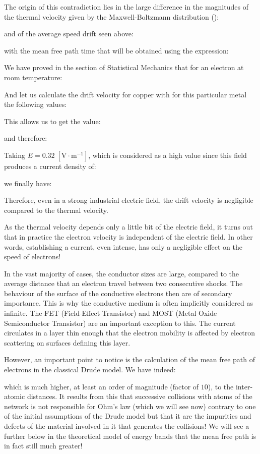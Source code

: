 	The origin of this contradiction lies in the large difference in the magnitudes of the thermal velocity given by the Maxwell-Boltzmann distribution ():
	
	and of the average speed drift seen above:
	
	with the mean free path time that will be obtained using the expression:
	
	
	We have proved in the section of Statistical Mechanics that for an electron at room temperature:
	
	And let us calculate the drift velocity for copper with for this particular metal the following values:
	
	This allows us to get the value:
	
	and therefore:
	
	Taking $E=0.32 \;[\text{V}\cdot\text{m}^{-1}]$, which is considered as a high value since this field produces a current density of:
	
	we finally have:
	
	Therefore, even in a strong industrial electric field, the drift velocity is negligible compared to the thermal velocity.
	
	As the thermal velocity depends only a little bit of the electric field, it turns out that in practice the electron velocity is independent of the electric field. In other words, establishing a current, even intense, has only a negligible effect on the speed of electrons!
	
	\begin{tcolorbox}[title=Remark,colframe=black,arc=10pt]
	In the vast majority of cases, the conductor sizes are large, compared to the average distance that an electron travel between two consecutive shocks. The behaviour of the surface of the conductive electrons then are of secondary importance. This is why the conductive medium is often implicitly considered as infinite. The FET (Field-Effect Transistor) and MOST (Metal Oxide Semiconductor Transistor) are an important exception to this. The current circulates in a layer thin enough that the electron mobility is affected by electron scattering on surfaces defining this layer.
	\end{tcolorbox}
	However, an important point to notice is the calculation of the mean free path of electrons in the classical Drude model. We have indeed:
	
	which is much higher, at least an order of magnitude (factor of $10$), to the inter-atomic distances. It results from this that successive collisions with atoms of the network is not responsible for Ohm's law (which we will see now) contrary to one of the initial assumptions of the Drude model but that it are the impurities and defects of the material involved in it that generates the collisions! We will see a further below in the theoretical model of energy bands that the mean free path is in fact still much greater!
	
